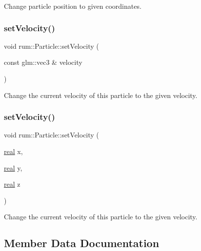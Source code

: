 Change particle position to given coordinates. \mbox{\label{classrum_1_1_particle_ab521aa9c870bbc63d72ebfef51561cb4}} 
\subsubsection{\texorpdfstring{set\+Velocity()}{setVelocity()}\hspace{0.1cm}{\footnotesize\ttfamily [1/2]}}
{\footnotesize\ttfamily void rum\+::\+Particle\+::set\+Velocity (\begin{DoxyParamCaption}\item[{const glm\+::vec3 \&}]{velocity }\end{DoxyParamCaption})}

Change the current velocity of this particle to the given velocity. \mbox{\label{classrum_1_1_particle_ab32f21d9858f009239ac37190f2ee732}} 
\subsubsection{\texorpdfstring{set\+Velocity()}{setVelocity()}\hspace{0.1cm}{\footnotesize\ttfamily [2/2]}}
{\footnotesize\ttfamily void rum\+::\+Particle\+::set\+Velocity (\begin{DoxyParamCaption}\item[{\mbox{\hyperlink{namespacerum_a7e8cca23573d5eaead0f138cbaa4862c}{real}}}]{x,  }\item[{\mbox{\hyperlink{namespacerum_a7e8cca23573d5eaead0f138cbaa4862c}{real}}}]{y,  }\item[{\mbox{\hyperlink{namespacerum_a7e8cca23573d5eaead0f138cbaa4862c}{real}}}]{z }\end{DoxyParamCaption})}

Change the current velocity of this particle to the given velocity. 

\subsection{Member Data Documentation}
\mbox{\label{classrum_1_1_particle_aee85fab3a2d274ecc7d997f1c0c34132}} 
